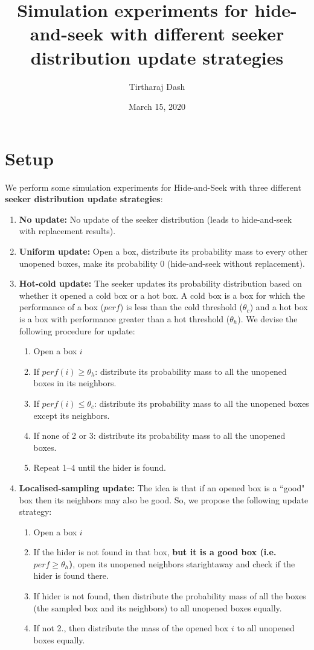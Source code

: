 \documentclass[11pt,a4paper]{article}
\title{Simulation experiments for hide-and-seek with different seeker distribution update strategies}
\author{Tirtharaj Dash}
\date{March 15, 2020}
\begin{document}
\maketitle

\section{Setup}

\noindent
We perform some simulation experiments for Hide-and-Seek with three different \textbf{seeker distribution update strategies}:
\begin{enumerate}[(1)]
	\item\label{snoupd} \textbf{No update:} No update of the seeker distribution (leads to hide-and-seek with replacement results).
	\item\label{supdwor} \textbf{Uniform update:} Open a box, distribute its probability mass to every other unopened boxes, make its probability 0 (hide-and-seek without replacement).
	\item\label{supdhc} \textbf{Hot-cold update:} The seeker updates its probability distribution based on whether it opened a cold box or a hot box. A cold box is a box for which the performance of a box ($perf$) is less than the cold threshold ($\theta_c$) and a hot box is a box with performance greater than a hot threshold ($\theta_h$). We devise the following procedure for update:
	\begin{enumerate}[1.]
		\item Open a box $i$
		\item If $perf(i) \geq \theta_h$: distribute its probability mass to all the unopened boxes in its neighbors. 
		\item If $perf(i) \leq \theta_c$: distribute its probability mass to all the unopened boxes except its neighbors.
		\item If none of 2 or 3: distribute its probability mass to all the unopened boxes.
		\item Repeat 1--4 until the hider is found.
	\end{enumerate}
	\item\label{supdloc} \textbf{Localised-sampling update:} The idea is that if an opened box is a ``good" box then its neighbors may also be good. So, we propose the following update strategy:
	\begin{enumerate}[1.]
		\item Open a box $i$
		\item If the hider is not found in that box, \textbf{but it is a good box (i.e. $perf \geq \theta_h$)}, open its unopened neighbors starightaway and check if the hider is found there.
		\item If hider is not found, then distribute the probability mass of all the boxes (the sampled box and its neighbors) to all unopened boxes equally.
		\item If not 2., then distribute the mass of the opened box $i$ to all unopened boxes equally. 
	\end{enumerate}
\end{enumerate}
\end{document}
